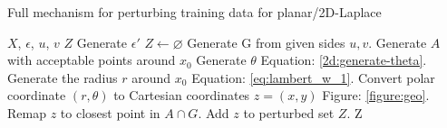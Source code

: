 \begin{algorithm}[H]
  \caption{Full mechanism for perturbing training data for planar/2D-Laplace \citep{DBLP:journals/corr/abs-1212-1984}}\label{alg:rq1}
  \begin{algorithmic}
    \Require $X$, $\epsilon$, $u$, $v$ 
    \Ensure $Z$ 
    \State Generate $\epsilon'$         
    \State $Z \gets \varnothing$
    \State Generate G from given sides $u, v$.
    \State Generate $A$ with acceptable points around $x_0$ 
    \State Generate $\theta$       \Comment Equation: \ref{2d:generate-theta}.
    \State Generate the radius $r$ around $x_0$ \Comment Equation: \ref{eq:lambert_w_1}.
    \State Convert polar coordinate $(r,\theta)$ to Cartesian coordinates $z = (x, y)$ \Comment Figure: \ref{figure:geo}.
        \State Remap $z$ to closest point in $A \cap G$. 
    \EndIf
    \State Add $z$ to perturbed set $Z$.
    \EndFor
    \State \Return Z
  \end{algorithmic}
  \label{alg:2d-laplace}
\end{algorithm}